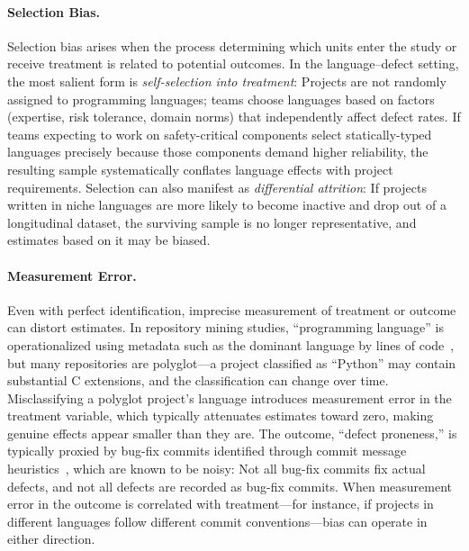 \paragraph{Selection Bias.}
Selection bias arises when the process determining which units enter the study or receive treatment is related to potential outcomes.
In the language--defect setting, the most salient form is \emph{self-selection into treatment}: Projects are not randomly assigned to programming languages; teams choose languages based on factors (expertise, risk tolerance, domain norms) that independently affect defect rates.
If teams expecting to work on safety-critical components select statically-typed languages precisely because those components demand higher reliability, the resulting sample systematically conflates language effects with project requirements.
Selection can also manifest as \emph{differential attrition}: If projects written in niche languages are more likely to become inactive and drop out of a longitudinal dataset, the surviving sample is no longer representative, and estimates based on it may be biased.

\paragraph{Measurement Error.}
Even with perfect identification, imprecise measurement of treatment or outcome can distort estimates.
In repository mining studies, ``programming language'' is operationalized using metadata such as the dominant language by lines of code~\cite{DBLP:conf/sigsoft/RayPFD14}, but many repositories are polyglot---a project classified as ``Python'' may contain substantial C extensions, and the classification can change over time.
Misclassifying a polyglot project's language introduces measurement error in the treatment variable, which typically attenuates estimates toward zero, making genuine effects appear smaller than they are.
The outcome, ``defect proneness,'' is typically proxied by bug-fix commits identified through commit message heuristics~\cite{DBLP:conf/sigsoft/RayPFD14}, which are known to be noisy: Not all bug-fix commits fix actual defects, and not all defects are recorded as bug-fix commits.
When measurement error in the outcome is correlated with treatment---for instance, if projects in different languages follow different commit conventions---bias can operate in either direction.

